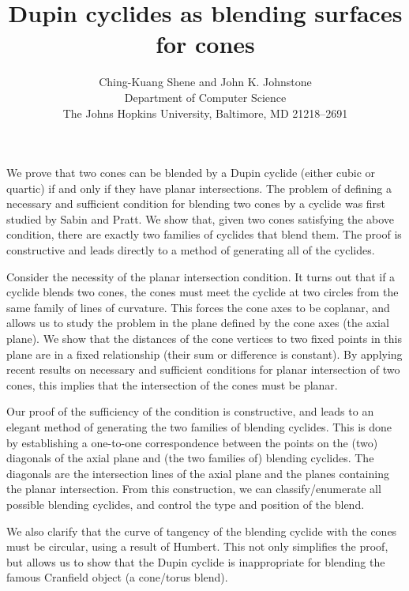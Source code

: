 
\title{Dupin cyclides as blending surfaces for cones}

\author{Ching-Kuang Shene and John K. Johnstone \\
        Department of Computer Science \\
        The Johns Hopkins University, Baltimore, MD 21218--2691}

\date{}

\setlength{\textheight}{8.75in}


\maketitle

\pagestyle{empty}

We prove that two cones can be blended by a Dupin cyclide
(either cubic or quartic) if and only if they have planar intersections.
The problem of defining a necessary and sufficient condition for
blending two cones by a cyclide was first studied by Sabin and Pratt.
We show that, given two cones satisfying the above condition,
there are exactly two families of cyclides that blend them.
The proof is constructive and leads directly to a method of generating
all of the cyclides.

Consider the necessity of the planar intersection condition.
It turns out that if a cyclide blends two cones, the cones must 
meet the cyclide at two circles from the same family of lines of curvature.
This forces the cone axes to be coplanar,
and allows us to study the problem in the plane defined by the cone axes
(the axial plane).
We show that the distances of the cone vertices to two fixed points in this
plane are in a fixed relationship (their sum or difference is constant).
By applying recent results on necessary and sufficient conditions for planar
intersection of two cones, this implies that the intersection of the
cones must be planar.

Our proof of the sufficiency of the condition is constructive, and
leads to an elegant method of generating the two families of blending cyclides.
This is done by establishing a one-to-one correspondence between the points
on the (two) diagonals of the axial plane and (the two families of)
blending cyclides.
The diagonals are the intersection lines of the axial plane and the planes
containing the planar intersection.
From this construction, we can classify/enumerate all possible blending
cyclides, and control the type and position of the blend.

We also clarify that the curve of tangency of the blending cyclide
with the cones must be circular, using a result of Humbert.
This not only simplifies the proof, but allows us to show
that the Dupin cyclide is inappropriate for blending the famous
Cranfield object (a cone/torus blend).


